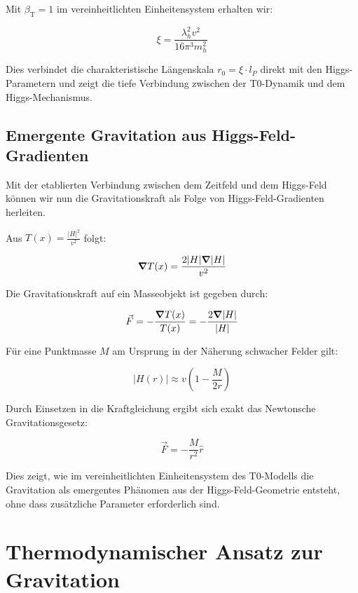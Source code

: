 \documentclass[12pt,a4paper]{article}
\newcommand{\Tfield}{T(x)}
\newcommand{\betaT}{\beta_{\text{T}}}
\begin{document}
	Mit \(\betaT = 1\) im vereinheitlichten Einheitensystem erhalten wir:
	
	\begin{equation}
		\xi = \frac{\lambda_h^2 v^2}{16\pi^3 m_h^2}
	\end{equation}
	
	Dies verbindet die charakteristische Längenskala \(r_0 = \xi \cdot l_P\) direkt mit den Higgs-Parametern und zeigt die tiefe Verbindung zwischen der T0-Dynamik und dem Higgs-Mechanismus.
	
	\subsection{Emergente Gravitation aus Higgs-Feld-Gradienten}
	Mit der etablierten Verbindung zwischen dem Zeitfeld und dem Higgs-Feld können wir nun die Gravitationskraft als Folge von Higgs-Feld-Gradienten herleiten.
	
	Aus \(\Tfield = \frac{|H|^2}{v^2}\) folgt:
	
	\begin{equation}
		\grad \Tfield = \frac{2|H|\grad|H|}{v^2}
	\end{equation}
	
	Die Gravitationskraft auf ein Masseobjekt ist gegeben durch:
	
	\begin{equation}
		\vec{F} = -\frac{\grad \Tfield}{\Tfield} = -\frac{2\grad|H|}{|H|}
	\end{equation}
	
	Für eine Punktmasse \(M\) am Ursprung in der Näherung schwacher Felder gilt:
	
	\begin{equation}
		|H(r)| \approx v\left(1 - \frac{M}{2r}\right)
	\end{equation}
	
	Durch Einsetzen in die Kraftgleichung ergibt sich exakt das Newtonsche Gravitationsgesetz:
	
	\begin{equation}
		\vec{F} = -\frac{M}{r^2} \hat{r}
	\end{equation}
	
	Dies zeigt, wie im vereinheitlichten Einheitensystem des T0-Modells die Gravitation als emergentes Phänomen aus der Higgs-Feld-Geometrie entsteht, ohne dass zusätzliche Parameter erforderlich sind.
	
	\section{Thermodynamischer Ansatz zur Gravitation}
	\label{sec:thermodynamic}
	
\end{document}

